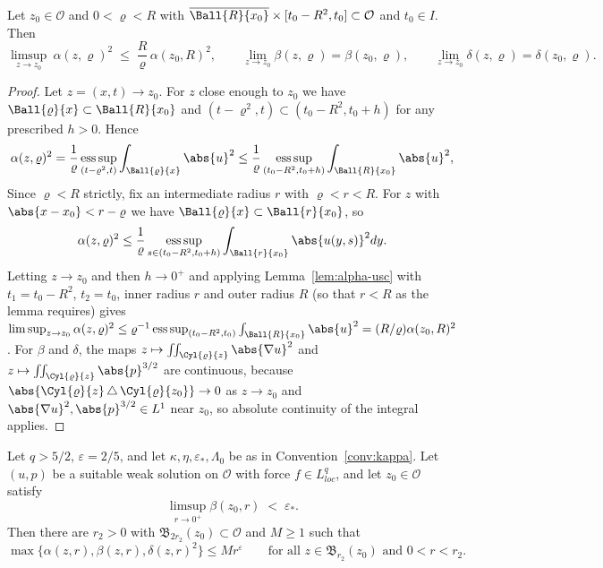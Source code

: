 \documentclass[11pt,reqno]{amsart}
\begin{document}
\begin{corollary}\label{cor:theta-usc}
Let $z_{0}\in\mathcal{O}$ and $0<\varrho<R$ with
$\overline{\Ball{R}{x_{0}}}\times[t_{0}-R^{2},t_{0}]\subset\mathcal{O}$ and
$t_{0}\in I$. Then
\begin{equation}\label{eq:theta-usc}
  \limsup_{z\to z_{0}}\ \alpha(z,\varrho)^{2}\;\le\;\frac R\varrho\,\alpha(z_{0},R)^{2},
  \qquad
  \lim_{z\to z_{0}}\beta(z,\varrho)=\beta(z_{0},\varrho),
  \qquad
  \lim_{z\to z_{0}}\delta(z,\varrho)=\delta(z_{0},\varrho).
\end{equation}
\end{corollary}

\begin{proof}
Let $z=(x,t)\to z_{0}$. For $z$ close enough to $z_{0}$ we have
$\Ball{\varrho}{x}\subset\Ball{R}{x_{0}}$ and
$(t-\varrho^{2},t)\subset(t_{0}-R^{2},t_{0}+h)$ for any prescribed $h>0$. Hence
\[
  \alpha(z,\varrho)^{2}
  =\frac1\varrho\operatorname*{ess\,sup}_{(t-\varrho^{2},t)}\int_{\Ball{\varrho}{x}}\abs{u}^{2}
  \le\frac1\varrho\operatorname*{ess\,sup}_{(t_{0}-R^{2},t_{0}+h)}\int_{\Ball{R}{x_{0}}}\abs{u}^{2},
\]
Since $\varrho<R$ strictly, fix an intermediate radius $r$ with
$\varrho<r<R$. For $z$ with $\abs{x-x_{0}}<r-\varrho$ we have
$\Ball{\varrho}{x}\subset\Ball{r}{x_{0}}$, so
\[
  \alpha(z,\varrho)^{2}
  \le\frac1\varrho\operatorname*{ess\,sup}_{s\in(t_{0}-R^{2},t_{0}+h)}
     \int_{\Ball{r}{x_{0}}}\abs{u(y,s)}^{2}dy .
\]
Letting $z\to z_{0}$ and then $h\to0^{+}$ and applying
Lemma~\ref{lem:alpha-usc} with $t_{1}=t_{0}-R^{2}$, $t_{2}=t_{0}$, inner radius
$r$ and outer radius $R$ (so that $r<R$ as the lemma requires) gives
$\limsup_{z\to z_{0}}\alpha(z,\varrho)^{2}
 \le\varrho^{-1}\operatorname*{ess\,sup}_{(t_{0}-R^{2},t_{0})}\int_{\Ball{R}{x_{0}}}\abs{u}^{2}
 =(R/\varrho)\alpha(z_{0},R)^{2}$.
For $\beta$ and $\delta$, the maps
$z\mapsto\iint_{\Cyl{\varrho}{z}}\abs{\nabla u}^{2}$ and
$z\mapsto\iint_{\Cyl{\varrho}{z}}\abs{p}^{3/2}$ are continuous, because
$\abs{\Cyl{\varrho}{z}\,\triangle\,\Cyl{\varrho}{z_{0}}}\to0$ as $z\to z_{0}$ and
$\abs{\nabla u}^{2},\abs{p}^{3/2}\in L^{1}$ near $z_{0}$, so absolute continuity
of the integral applies.
\end{proof}

\begin{proposition}\label{prop:morrey-decay}
Let $q>5/2$, $\varepsilon=2/5$, and let $\kappa,\eta,\varepsilon_{*},\Lambda_{0}$
be as in Convention~\ref{conv:kappa}. Let $(u,p)$ be a suitable weak solution on
$\mathcal{O}$ with force $f\in L^{q}_{loc}$, and let $z_{0}\in\mathcal{O}$
satisfy
\begin{equation}\label{eq:morrey-decay-hyp}
  \limsup_{r\to0^{+}}\beta(z_{0},r)\;<\;\varepsilon_{*}.
\end{equation}
Then there are $r_{2}>0$ with
$\mathfrak{B}_{2r_{2}}(z_{0})\subset\mathcal{O}$ and $M\ge1$ such that
\begin{equation}\label{eq:morrey-decay}
  \max\bigl\{\alpha(z,r),\beta(z,r),\delta(z,r)^{2}\bigr\}\le M r^{\varepsilon}
  \qquad\text{for all }z\in\mathfrak{B}_{r_{2}}(z_{0})\text{ and }0<r<r_{2}.
\end{equation}
\end{proposition}
\end{document}
